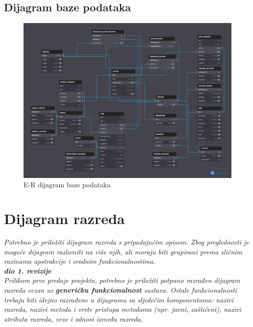 			\fi			
										
			
			\subsection{Dijagram baze podataka}			
			
				\vspace{12pt}						
				
				\begin{figure}[H] %
					\centering
					\includegraphics[width=\textwidth]{slike/grafBaza.PNG}
					\caption{E-R dijagram baze podataka}
					\label{fig:ERdiagram}
				\end{figure}																												
																																	
			\eject
						
			
			
		\section{Dijagram razreda}
		
			\textit{Potrebno je priložiti dijagram razreda s pripadajućim opisom. Zbog preglednosti je moguće dijagram razlomiti na više njih, ali moraju biti grupirani prema sličnim razinama apstrakcije i srodnim funkcionalnostima.}\\
			
			\textbf{\textit{dio 1. revizije}}\\
			
			\textit{Prilikom prve predaje projekta, potrebno je priložiti potpuno razrađen dijagram razreda vezan uz \textbf{generičku funkcionalnost} sustava. Ostale funkcionalnosti trebaju biti idejno razrađene u dijagramu sa sljedećim komponentama: nazivi razreda, nazivi metoda i vrste pristupa metodama (npr. javni, zaštićeni), nazivi atributa razreda, veze i odnosi između razreda.}\\
			
